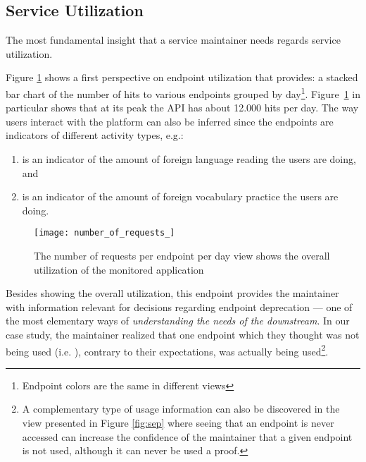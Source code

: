 \documentclass{sig-alternate-05-2015}
\begin{document}
\subsection{Service Utilization}
\label{sec:util}

The most fundamental insight that a service maintainer needs regards service utilization. %

Figure \ref{fig:aeu} shows a first perspective on endpoint utilization that \tool provides: a stacked bar chart of the number of hits to various endpoints grouped by day\footnote{Endpoint colors are the same in different views}. Figure~\ref{fig:aeu} in particular shows that at its peak the API has about 12.000 hits per day. 
The way users interact with the platform can also be inferred since the endpoints are indicators of different activity types, e.g.: 

\begin{enumerate}
	
	\item {\color{myred} \epTranslations} is an indicator of the amount of foreign language reading the users are doing, and 
	
	\item {\color{mygreen} \epOutcome} is an indicator of the amount of foreign vocabulary practice the users are doing.
	
\end{enumerate}


\begin{figure}[!ht]
	\centering
	\texttt{[image: number\_of\_requests\_]}
	\caption{The number of requests per endpoint per day view shows the overall utilization of the monitored application}
	\label{fig:aeu}
\end{figure}

Besides showing the overall utilization, this endpoint provides the maintainer with information relevant for decisions regarding endpoint deprecation --- one of the most elementary ways of {\em understanding the needs of the downstream}\cite{Haen14a}. In our case study, the maintainer realized that one endpoint which they thought was not being used (i.e. ), contrary to their expectations, was actually being used\footnote{A complementary type of usage information can also be discovered in the view presented in Figure \ref{fig:sep} where seeing that an endpoint is never accessed can increase the confidence of the maintainer that a given endpoint is not used, although it can never be used a proof.}.
\end{document}

